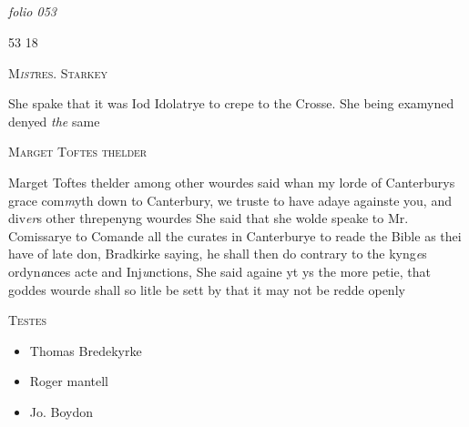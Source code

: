\documentclass[12pt, a4paper]{book}
\begin{document}
\dotfill
						\newpage {} \subsection*{}

\textit{folio 053}


\begin{flushright}{\color{Mahogany}53} 18\end{flushright}
 

	
				\begin{center}  {\scshape M\textit{ist}res. Starkey}  \end{center}
			
 
		\ifthenelse{\isodd{\thepage}}
		{\reversemarginpar}
		{\normalmarginpar}
		She spake that it was Iod Idolatrye to crepe
 to the Crosse. She being examyned denyed \textit{the} same
 

               
               	
				\begin{center}  {\scshape Marget Toftes thelder}  \end{center}
			
               	
               		
		\ifthenelse{\isodd{\thepage}}
		{\reversemarginpar}
		{\normalmarginpar}
		Marget Toftes thelder among other wourdes said
               			whan my lorde of Canterburys grace com\textit{m}yth down
               			to Canterbury, we truste to have adaye againste
 you, and div\textit{er}s other threpenyng wourdes
               			She said that she wolde speake to Mr. Comissarye
               			to Comande all the curates in Canterburye to reade
               			the Bible as thei have of late don, Bradkirke
 saying, he shall then do contrary to the kyng\textit{e}s ordyn\textit{a}nces
 acte and Inj\textit{u}nctions, She said againe yt ys the
 more petie, that goddes wourde shall so litle be sett by
 that it may not be redde openly
               	
               	
               		
				\marginpar[\vspace{0.5cm}{\textcolor{Gray}{n}}]{}
			
               		\begin{center} {\scshape Testes} \end{center}\begin{itemize}
               			
               			\item[]Thomas Bredekyrke
               			\item[]Roger mantell
               			\item[]Jo. Boydon
               		\end{itemize}
               	
\end{document}
